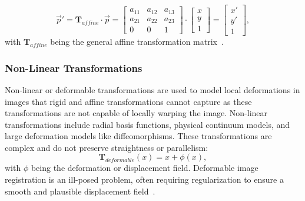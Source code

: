 \begin{equation}
	\overrightarrow{p}' = \mathbf{T}_{affine} \cdot  \overrightarrow{p} = 
	\begin{bmatrix}
		a_{11} & a_{12} & a_{13}\\
		a_{21} & a_{22} & a_{23}\\
		0 & 0 & 1
	\end{bmatrix}
	\cdot
	\begin{bmatrix}
		x\\
		y\\
		1
	\end{bmatrix}
	 = 
	 \begin{bmatrix}
		x'\\
		y'\\
		1
	\end{bmatrix},
\end{equation}
with $\mathbf{T}_{affine}$ being the general affine transformation matrix~\cite{Strittmatter2023}.

\subsubsection{Non-Linear Transformations}
Non-linear or deformable transformations are used to model local deformations in images that rigid and affine transformations cannot capture as these transformations are not capable of locally warping the image. Non-linear transformations include radial basis functions, physical continuum models, and large deformation models like diffeomorphisms. These transformations are complex and do not preserve straightness or parallelism:
\begin{equation}
	\mathbf{T}_{deformable} (x) = x + \phi (x),
\end{equation}
with $\phi$ being the deformation or displacement field. Deformable image registration is an ill-posed problem, often requiring regularization to ensure a smooth and plausible displacement field~\cite{Strittmatter2023}.

